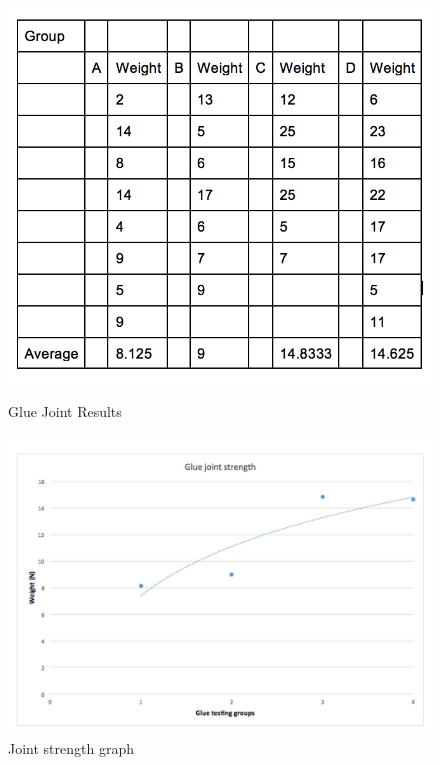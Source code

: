 \documentclass[12pt]{article}
\begin{document}
                \begin{figure}[ht]
                 	\centering
			\begin{minipage}[b]{0.45\linewidth}
			\includegraphics[width=1\textwidth]{GlueResults}
			\caption{Glue Joint Results}
			\label{fig:minipage1}
		\end{minipage}
		\quad
	\begin{minipage}[b]{0.45\linewidth}
			\includegraphics[width=1.2\textwidth]{GlueGraphlegit}
			\caption{Joint strength graph}
			\label{fig:minipage2}
		\end{minipage}
		\end{figure}
                
\end{document}

